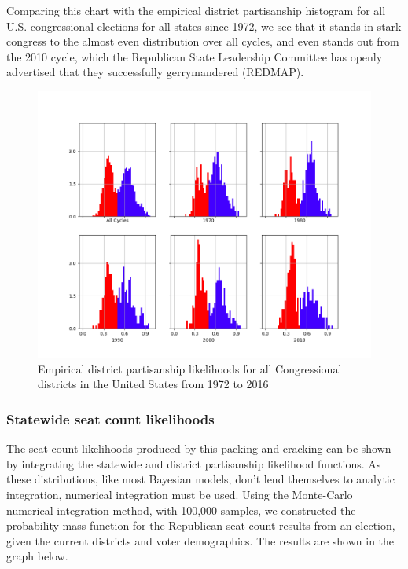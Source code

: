 \documentclass[preprint,12pt]{article}
\begin{document}
Comparing this chart with the empirical district partisanship histogram for all U.S. congressional elections for all states since 1972, we see that it stands in stark congress to the almost even distribution over all cycles, and even stands out from the 2010 cycle, which the Republican State Leadership Committee has openly advertised that they successfully gerrymandered (REDMAP).

\begin{figure}[htb!]
    \begin{center}
        \includegraphics[scale=0.4]{../Figures/WI2010/cycle_partisan_likelihoods.png}
        \caption{Empirical district partisanship likelihoods for all Congressional districts in the United States from 1972 to 2016}\label{fig:LikelihoodsDistrictPartisanshipAll}
    \end{center}
\end{figure}
 
\subsubsection{Statewide seat count likelihoods}
 
The seat count likelihoods produced by this packing and cracking can be shown by integrating the statewide and district partisanship likelihood functions.  As these distributions, like most Bayesian models, don't lend themselves to analytic integration, numerical integration must be used. Using the Monte-Carlo numerical integration method, with 100,000 samples, we constructed the probability mass function for the Republican seat count results from an election, given the current districts and voter demographics.  The results are shown in the graph below.
 
\end{document}
